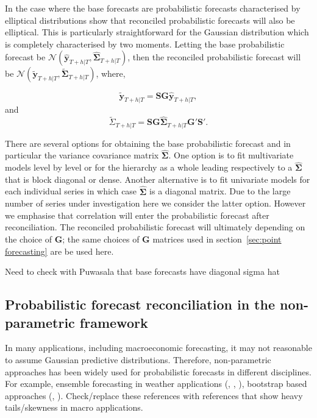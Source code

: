 \documentclass[graybox]{svmult}
\begin{document}
In the case where the base forecasts are probabilistic forecasts characterised by elliptical distributions \cite{Gamakumara2018} show that reconciled probabilistic forecasts will also be elliptical.  This is particularly straightforward for the Gaussian distribution which is completely characterised by two moments.  Letting the base probabilistic forecast be $\mathscr{N}(\bm{\hat{y}}_{T+h|T}, \hat{\bm{\Sigma}}_{T+h|T})$, then the reconciled probabilistic forecast will be $\mathscr{N}(\bm{\tilde{y}}_{T+h|T}, \tilde{\bm{\Sigma}}_{T+h|T})$, where,

\begin{equation}\label{eq:rec mean}
\bm{\tilde{y}}_{T+h|T} = \bm{SG}\bm{\hat{y}}_{T+h|T},
\end{equation}
and
\begin{equation}\label{eq:rec var}
\tilde{\Sigma}_{T+h|T} = \bm{SG}\hat{\bm{\Sigma}}_{T+h|T}\bm{G'S'}.
\end{equation}

There are several options for obtaining the base probabilistic forecast and in particular the variance covariance matrix $\hat{\bm{\Sigma}}$.  One option is to fit multivariate models level by level or for the hierarchy as a whole leading respectively to a $\hat{\bm \Sigma}$ that is block diagonal or dense.  Another alternative is to fit univariate models for each individual series in which case $\hat{\bm{\Sigma}}$ is a diagonal matrix. Due to the large number of series under investigation here we consider the latter option.  However we emphasise that correlation will enter the probabilistic forecast after reconciliation.  The reconciled probabilistic forecast will ultimately depending on the choice of $\bm{G}$; the same choices of $\bm{G}$ matrices used in section~\ref{sec:point forecasting} are be used here.

{\color{red} Need to check with Puwasala that base forecasts have diagonal sigma hat}

\subsection{Probabilistic forecast reconciliation in the non-parametric framework}\label{sec:probrecnp}

In many applications, including macroeconomic forecasting, it may not reasonable to assume Gaussian predictive distributions. Therefore, non-parametric approaches has been widely used for probabilistic forecasts in different disciplines. For example, ensemble forecasting in weather applications (\cite{Gneiting2005}, \cite{Gneiting2014}, \cite{Gneiting2008}), bootstrap based approaches (\cite{Manzan2008}, \cite{Vilar2013}). {\color{red} Check/replace these references with references that show heavy tails/skewness in macro applications.}
\end{document}
